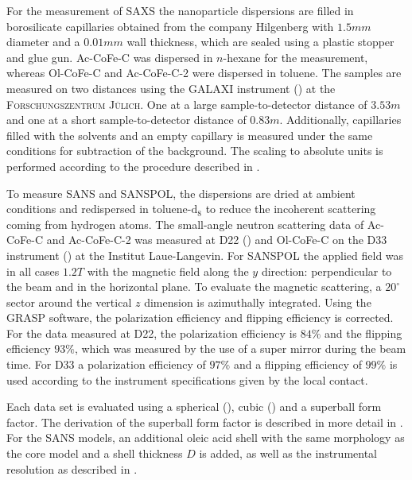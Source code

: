 \documentclass[\main/dresen_thesis.tex]{subfiles}
\begin{document}
    For the measurement of SAXS the nanoparticle dispersions are filled in borosilicate capillaries obtained from the company Hilgenberg with $1.5 \unit{mm}$ diameter and a $0.01 \unit{mm}$ wall thickness, which are sealed using a plastic stopper and glue gun.
    Ac-CoFe-C was dispersed in $\mathit{n}$-hexane for the measurement, whereas Ol-CoFe-C and Ac-CoFe-C-2 were dispersed in toluene.
    The samples are measured on two distances using the GALAXI instrument () at the \textsc{Forschungszentrum J\"ulich}.
    One at a large sample-to-detector distance of $3.53 \unit{m}$ and one at a short sample-to-detector distance of $0.83 \unit{m}$.
    Additionally, capillaries filled with the solvents and an empty capillary is measured under the same conditions for subtraction of the background.
    The scaling to absolute units is performed according to the procedure described in .

    To measure SANS and SANSPOL, the dispersions are dried at ambient conditions and redispersed in toluene-$\mathrm{d_8}$ to reduce the incoherent scattering coming from hydrogen atoms.
    The small-angle neutron scattering data of Ac-CoFe-C and Ac-CoFe-C-2 was measured at D22 () and Ol-CoFe-C on the D33 instrument () at the Institut Laue-Langevin.
    For SANSPOL the applied field was in all cases $1.2 \unit{T}$ with the magnetic field along the $y$ direction: perpendicular to the beam and in the horizontal plane.
    To evaluate the magnetic scattering, a $20^\circ$ sector around the vertical $z$ dimension is azimuthally integrated.
    Using the GRASP software, the polarization efficiency and flipping efficiency is corrected.
    For the data measured at D22, the polarization efficiency is $84 \%$ and the flipping efficiency $93 \%$, which was measured by the use of a super mirror during the beam time.
    For D33 a polarization efficiency of $97 \%$ and a flipping efficiency of $99 \%$ is used according to the instrument specifications given by the local contact.

    Each data set is evaluated using a spherical (), cubic () and a superball form factor.
    The derivation of the superball form factor is described in more detail in .
    For the SANS models, an additional oleic acid shell with the same morphology as the core model and a shell thickness $D$ is added, as well as the instrumental resolution as described in .
\end{document}
